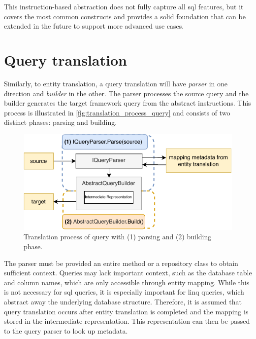 This instruction-based abstraction does not fully capture all \acrshort{sql} features, but it covers the most common constructs and provides a solid foundation that can be extended in the future to support more advanced use cases. 

\section{Query translation}
Similarly, to entity translation, a query translation will have \textit{parser} in one direction and \textit{builder} in the other. The parser processes the source query and the builder generates the target framework query from the abstract instructions. This process is illustrated in \autoref{fig:translation_process_query} and consists of two distinct phases: parsing and building.

\begin{figure}[H]
  \centering
  \includegraphics[scale=1]{thesis/img/thesis/04_translate_process_queries.drawio.pdf}
  \caption{Translation process of query with (1) parsing and (2) building phase.}
  \label{fig:translation_process_query}
\end{figure}

The parser must be provided an entire method or a repository class to obtain sufficient context. Queries may lack important context, such as the database table and column names, which are only accessible through entity mapping. While this is not necessary for \acrshort{sql} queries, it is especially important for \acrshort{linq} queries, which abstract away the underlying database structure. Therefore, it is assumed that query translation occurs after entity translation is completed and the mapping is stored in the intermediate representation. This representation can then be passed to the query parser to look up metadata.

